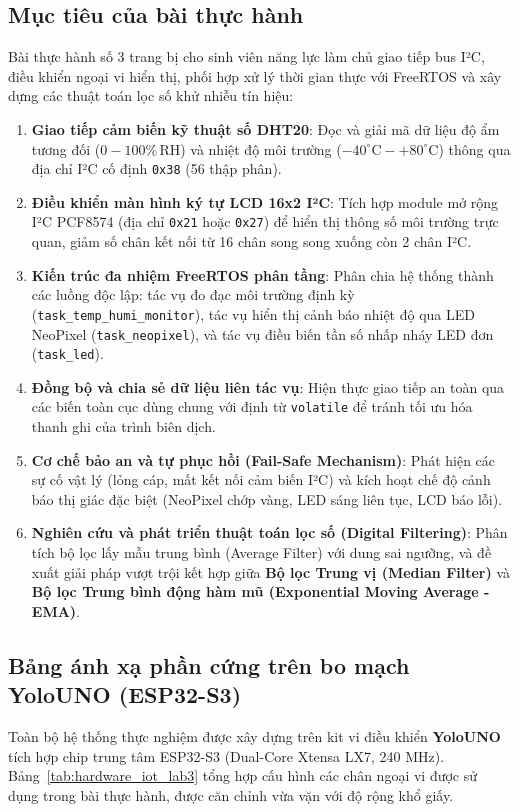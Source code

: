 \subsection{Mục tiêu của bài thực hành}
Bài thực hành số 3 trang bị cho sinh viên năng lực làm chủ giao tiếp bus I²C, điều khiển ngoại vi hiển thị, phối hợp xử lý thời gian thực với FreeRTOS và xây dựng các thuật toán lọc số khử nhiễu tín hiệu:
\begin{enumerate}[leftmargin=*]
    \item \textbf{Giao tiếp cảm biến kỹ thuật số DHT20}: Đọc và giải mã dữ liệu độ ẩm tương đối ($0 - 100\%\,\text{RH}$) và nhiệt độ môi trường ($-40^\circ\text{C} - +80^\circ\text{C}$) thông qua địa chỉ I²C cố định \texttt{0x38} (56 thập phân).
    \item \textbf{Điều khiển màn hình ký tự LCD 16x2 I²C}: Tích hợp module mở rộng I²C PCF8574 (địa chỉ \texttt{0x21} hoặc \texttt{0x27}) để hiển thị thông số môi trường trực quan, giảm số chân kết nối từ 16 chân song song xuống còn 2 chân I²C.
    \item \textbf{Kiến trúc đa nhiệm FreeRTOS phân tầng}: Phân chia hệ thống thành các luồng độc lập: tác vụ đo đạc môi trường định kỳ (\texttt{task\_temp\_humi\_monitor}), tác vụ hiển thị cảnh báo nhiệt độ qua LED NeoPixel (\texttt{task\_neopixel}), và tác vụ điều biến tần số nhấp nháy LED đơn (\texttt{task\_led}).
    \item \textbf{Đồng bộ và chia sẻ dữ liệu liên tác vụ}: Hiện thực giao tiếp an toàn qua các biến toàn cục dùng chung với định từ \texttt{volatile} để tránh tối ưu hóa thanh ghi của trình biên dịch.
    \item \textbf{Cơ chế bảo an và tự phục hồi (Fail-Safe Mechanism)}: Phát hiện các sự cố vật lý (lỏng cáp, mất kết nối cảm biến I²C) và kích hoạt chế độ cảnh báo thị giác đặc biệt (NeoPixel chớp vàng, LED sáng liên tục, LCD báo lỗi).
    \item \textbf{Nghiên cứu và phát triển thuật toán lọc số (Digital Filtering)}: Phân tích bộ lọc lấy mẫu trung bình (Average Filter) với dung sai ngưỡng, và đề xuất giải pháp vượt trội kết hợp giữa \textbf{Bộ lọc Trung vị (Median Filter)} và \textbf{Bộ lọc Trung bình động hàm mũ (Exponential Moving Average - EMA)}.
\end{enumerate}

\subsection{Bảng ánh xạ phần cứng trên bo mạch YoloUNO (ESP32-S3)}
Toàn bộ hệ thống thực nghiệm được xây dựng trên kit vi điều khiển \textbf{YoloUNO} tích hợp chip trung tâm ESP32-S3 (Dual-Core Xtensa LX7, 240 MHz). Bảng~\ref{tab:hardware_iot_lab3} tổng hợp cấu hình các chân ngoại vi được sử dụng trong bài thực hành, được căn chỉnh vừa vặn với độ rộng khổ giấy.

